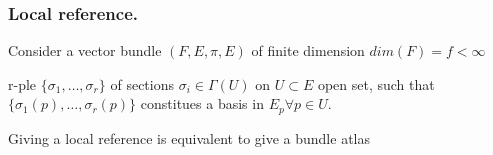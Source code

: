 \documentclass[a4paper,12pt]{scrartcl}    %
\begin{document}
\subsubsection{Local reference.}
Consider a vector bundle $(F,E,\pi,E)$ of finite dimension $dim(F)= f < \infty$

\begin{definition}
r-ple $\{ \sigma_1, \ldots, \sigma_r \} $ of sections $\sigma_i \in \Gamma(U)$ on  $U \subset E$ open set, 
such that $\{ \sigma_1(p), \ldots, \sigma_r(p) \}$ constitues a  basis in $E_p \forall p \in U$.
\end{definition}

\begin{proposition}
Giving a local reference is equivalent to give a bundle atlas
\end{proposition}
\end{document}
